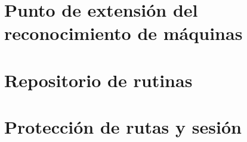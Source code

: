 \section{Punto de extensión del reconocimiento de máquinas}



\section{Repositorio de rutinas}



\section{Protección de rutas y sesión}




